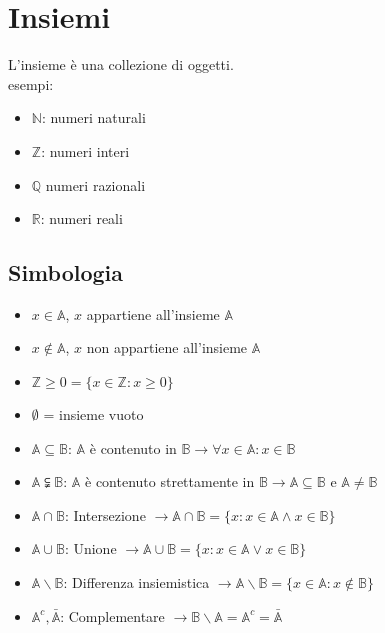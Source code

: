 \documentclass{article}
\begin{document}
\section{Insiemi}

L'insieme è una collezione di oggetti.\\

\noindent
esempi:

\begin{itemize}
    \item $\mathbb{N}$: numeri naturali
    \item $\mathbb{Z}$: numeri interi
    \item $\mathbb{Q}$ numeri razionali
    \item $\mathbb{R}$: numeri reali
\end{itemize}

\subsection{Simbologia}

\begin{itemize}
    \item $x \in \mathbb{A}$, $x$ appartiene all'insieme $\mathbb{A}$
    \item $x \notin \mathbb{A}$, $x$ non appartiene all'insieme $\mathbb{A}$
    \item $\mathbb{Z} \geq 0 = \{ x \in \mathbb{Z} : x \geq 0 \}$
    \item $\emptyset$ = insieme vuoto
    \item $\mathbb{A} \subseteq \mathbb{B}$: $\mathbb{A}$ è contenuto in $\mathbb{B} \longrightarrow \forall x \in \mathbb{A} : x \in \mathbb{B}$
    \item $\mathbb{A} \subsetneqq \mathbb{B}$: $\mathbb{A}$ è contenuto strettamente in $\mathbb{B} \longrightarrow \mathbb{A} \subseteq \mathbb{B}$ e $\mathbb{A} \neq \mathbb{B}$
    \item $\mathbb{A} \cap \mathbb{B}$: Intersezione $\longrightarrow \mathbb{A} \cap \mathbb{B} = \{ x : x \in \mathbb{A} \wedge x \in \mathbb{B} \}$
    \item $\mathbb{A} \cup \mathbb{B}$: Unione $\longrightarrow \mathbb{A} \cup \mathbb{B} = \{ x : x \in \mathbb{A} \vee x \in \mathbb{B} \}$
    \item $\mathbb{A} \backslash \mathbb{B}$: Differenza insiemistica $\longrightarrow \mathbb{A} \backslash \mathbb{B} = \{ x \in \mathbb{A} : x \notin \mathbb{B} \}$
    \item $\mathbb{A}^c, \bar{\mathbb{A}}$: Complementare $\longrightarrow \mathbb{B} \backslash \mathbb{A} = \mathbb{A}^c = \bar{\mathbb{A}}$
\end{itemize}
\end{document}
